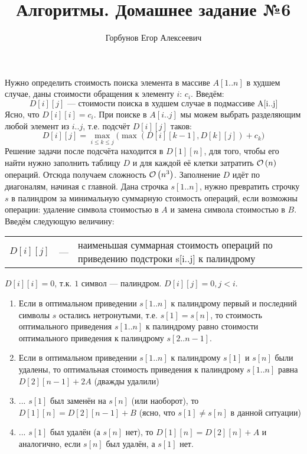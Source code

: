 
\title{Алгоритмы. Домашнее задание №6}
\author{Горбунов Егор Алексеевич}


\maketitle

Нужно определить стоимость поиска элемента в массиве $A[1..n]$ в худшем случае, даны стоимости обращения к элементу $i$: $c_i$. Введём:
\[
	D[i][j] \text{ --- стоимости поиска в худшем случае в подмассиве A[i..j]}
\]
Ясно, что $D[i][i]=c_i$. При поиске в $A[i..j]$ мы можем выбрать разделяющим любой элемент из $i..j$, т.е. подсчёт $D[i][j]$ таков:
\[
D[i][j] = \max_{i \leq k \leq j}{(\max{(D[i][k-1], D[k][j]) + c_k)}}
\]
Решение задачи после подсчёта находится в $D[1][n]$, для того, чтобы его найти нужно заполнить таблицу $D$ и для
каждой её клетки затратить $\mathcal{O}\left(n\right)$ операций. Отсюда получаем сложность $\mathcal{O}\left(n^3\right)$. Заполнение $D$ идёт по диагоналям, начиная с главной. \xqed
{}
Дана строчка $s[1..n]$, нужно превратить строчку $s$ в палиндром за минимальную суммарную стоимость операций,
если возможны операции: удаление символа стоимостью в $A$ и замена символа стоимостью в $B$.\\
Введём следующую величину:
\begin{center}
\vspace{3mm}
\begin{tabular}[ht!]{lcp{13cm}}
	$D[i][j]$ & --- & наименьшая суммарная стоимость операций по приведению подстроки s[i..j] к палиндрому\\
\end{tabular}
\vspace{3mm}
\end{center}
$D[i][i] = 0$, т.к. $1$ символ --- палиндром. $D[i][j] = 0, j<i$.\\
\begin{enumerate}
\item Если в оптимальном приведении $s[1..n]$ к палиндрому первый и последний символы $s$ остались нетронутыми, 
т.е. $s[1]=s[n]$, то стоимость оптимального приведения $s[1..n]$ к палиндрому равно стоимости оптимального 
приведения к палиндрому $s[2..n-1]$.
\item Если в оптимальном приведении $s[1..n]$ к палиндрому $s[1]$ и $s[n]$ были удалены, то оптимальная стоимость 
приведения к палиндрому $s[1..n]$ равна $D[2][n-1]+2A$ (дважды удалили)
\item ... $s[1]$ был заменён на $s[n]$ (или наоборот), то $D[1][n] = D[2][n-1]+B$ (ясно, что $s[1]\neq s[n]$ в данной ситуации)
\item ... $s[1]$ был удалён (а $s[n]$ нет), то $D[1][n]=D[2][n]+A$ и аналогично, если $s[n]$ был удалён, а $s[1]$ нет.
\end{enumerate}
